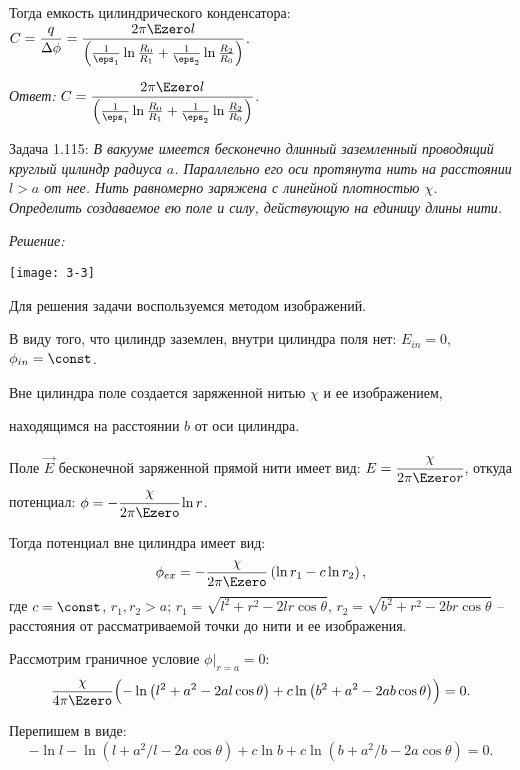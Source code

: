 Тогда емкость цилиндрического конденсатора: \( \ds C = \frac{q}{\Delta\phi} =
\frac{2\pi\Ezero l}{\left(\frac{1}{\eps_1}\ln\frac{R_0}{R_1} + \frac{1}{\eps_2}
\ln\frac{R_2}{R_0}\right)} \).

\emph{Ответ:} \( \ds C =\frac{2\pi\Ezero l}{\left(\frac{1}{\eps_1}
\ln\frac{R_0}{R_1} + \frac{1}{\eps_2}\ln\frac{R_2}{R_0}\right)} \).

\newpage
Задача 1.115: \emph{В вакууме имеется бесконечно длинный заземленный проводящий
круглый цилиндр радиуса \( a \). Параллельно его оси протянута нить на
расстоянии \( l > a \) от нее. Нить равномерно заряжена с линейной плотностью
\( \chi \). Определить создаваемое ею поле и силу, действующую на единицу длины
нити.}

\vspace*{2em}
\emph{Решение:}

\begin{minipage}{.5\textwidth}
    \texttt{[image: 3-3]}
\end{minipage}
\begin{minipage}{.46\textwidth}
    Для решения задачи воспользуемся методом изображений.
    
    В виду того, что цилиндр заземлен, внутри цилиндра поля нет:
    \( E_{in} = 0 \), \( \phi_{in} = \const \).
    
    Вне цилиндра поле создается заряженной нитью \( \chi \) и ее изображением,
\end{minipage}
находящимся на расстоянии \( b \) от оси цилиндра.
    
Поле \( \vec{E} \) бесконечной заряженной прямой нити имеет вид:
\( E = \cfrac{\chi}{2\pi\Ezero r} \), откуда потенциал:
\( \phi = -\cfrac{\chi}{2\pi\Ezero}\ln r \).

Тогда потенциал вне цилиндра имеет вид:
\[
    \phi_{ex} = -\frac{\chi}{2\pi\Ezero}\left(\ln r_1 - c\ln r_2\right),
\]
где \( c = \const \), \( r_1, r_2 > a \);
\( r_1 = \sqrt{l^2 + r^2 - 2lr\cos\theta} \),
\( r_2 = \sqrt{b^2 + r^2 - 2br\cos\theta} \) -- расстояния от рассматриваемой
точки до нити и ее изображения.

Рассмотрим граничное условие \( \phi\bigl|_{r = a} = 0 \):
\[
    \frac{\chi}{4\pi\Ezero}\Bigl(-\ln\left(l^2 + a^2 - 2al\cos\theta\right) +
    c\ln\left(b^2 + a^2 - 2ab\cos\theta\right)\Bigr) = 0.
\]
    
Перепишем в виде:
\[    
    -\ln l - \ln\left(l + a^2/l - 2a\cos\theta\right) + c\ln b +
    c\ln\left(b + a^2/b - 2a\cos\theta\right) = 0.
\]

